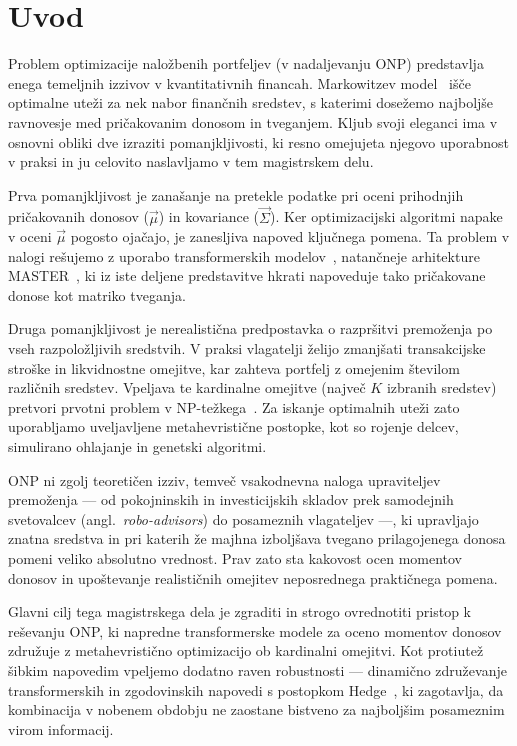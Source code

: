 \chapter{Uvod}
\label{ch:uvod}

Problem optimizacije naložbenih portfeljev (v nadaljevanju ONP) predstavlja enega temeljnih izzivov v kvantitativnih financah. Markowitzev model~\cite{markowitz1952} išče optimalne uteži za nek nabor finančnih sredstev, s katerimi dosežemo najboljše ravnovesje med pričakovanim donosom in tveganjem. Kljub svoji eleganci ima v osnovni obliki dve izraziti pomanjkljivosti, ki resno omejujeta njegovo uporabnost v praksi in ju celovito naslavljamo v tem magistrskem delu.

Prva pomanjkljivost je zanašanje na pretekle podatke pri oceni prihodnjih pričakovanih donosov ($\vec{\mu}$) in kovariance ($\vec{\Sigma}$). Ker optimizacijski algoritmi napake v oceni $\vec{\mu}$ pogosto ojačajo, je zanesljiva napoved ključnega pomena. Ta problem v nalogi rešujemo z uporabo transformerskih modelov~\cite{vaswani2017}, natančneje arhitekture MASTER~\cite{li2024master}, ki iz iste deljene predstavitve hkrati napoveduje tako pričakovane donose kot matriko tveganja.

Druga pomanjkljivost je nerealistična predpostavka o razpršitvi premoženja po vseh razpoložljivih sredstvih. V praksi vlagatelji želijo zmanjšati transakcijske stroške in likvidnostne omejitve, kar zahteva portfelj z omejenim številom različnih sredstev. Vpeljava te kardinalne omejitve (največ $K$ izbranih sredstev) pretvori prvotni problem v NP-težkega~\cite{chang2000}. Za iskanje optimalnih uteži zato uporabljamo uveljavljene metahevristične postopke, kot so rojenje delcev, simulirano ohlajanje in genetski algoritmi.

ONP ni zgolj teoretičen izziv, temveč vsakodnevna naloga upraviteljev premoženja --- od pokojninskih in investicijskih skladov prek samodejnih svetovalcev (angl.\ \emph{robo-advisors}) do posameznih vlagateljev ---, ki upravljajo znatna sredstva in pri katerih že majhna izboljšava tvegano prilagojenega donosa pomeni veliko absolutno vrednost. Prav zato sta kakovost ocen momentov donosov in upoštevanje realističnih omejitev neposrednega praktičnega pomena.

Glavni cilj tega magistrskega dela je zgraditi in strogo ovrednotiti pristop k reševanju ONP, ki napredne transformerske modele za oceno momentov donosov združuje z metahevristično optimizacijo ob kardinalni omejitvi. Kot protiutež šibkim napovedim vpeljemo dodatno raven robustnosti --- dinamično združevanje transformerskih in zgodovinskih napovedi s postopkom Hedge~\cite{freund1997}, ki zagotavlja, da kombinacija v nobenem obdobju ne zaostane bistveno za najboljšim posameznim virom informacij.

